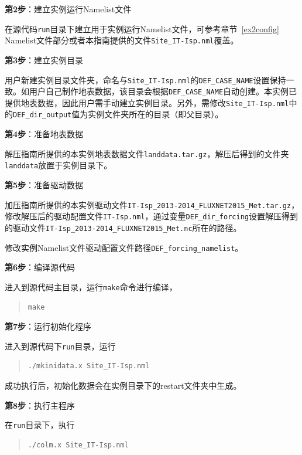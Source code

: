 \bigskip
\textbf{第2步}：建立实例运行Namelist文件

在源代码\texttt{run}目录下建立用于实例运行Namelist文件，可参考章节~\ref{ex2config} Namelist文件部分或者本指南提供的文件\texttt{Site\_IT-Isp.nml}覆盖。

\bigskip
\textbf{第3步}：建立实例目录

用户新建实例目录文件夹，命名与\texttt{Site\_IT-Isp.nml}的\texttt{DEF\_CASE\_NAME}设置保持一致。如用户自己制作地表数据，该目录会根据\texttt{DEF\_CASE\_NAME}自动创建。本实例已提供地表数据，因此用户需手动建立实例目录。另外，需修改\texttt{Site\_IT-Isp.nml}中的\texttt{DEF\_dir\_output}值为实例文件夹所在的目录（即父目录）。

\bigskip
\textbf{第4步}：准备地表数据

解压指南所提供的本实例地表数据文件\texttt{landdata.tar.gz}，解压后得到的文件夹\texttt{landdata}放置于实例目录下。

\bigskip
\textbf{第5步}：准备驱动数据

加压指南所提供的本实例驱动文件\texttt{IT-Isp\_2013-2014\_FLUXNET2015\_Met.tar.gz}，修改解压后的驱动配置文件\texttt{IT-Isp.nml}，通过变量\texttt{DEF\_dir\_forcing}设置解压得到的驱动文件\texttt{IT-Isp\_2013-2014\_FLUXNET2015\_Met.nc}所在的路径。

修改实例Namelist文件驱动配置文件路径\texttt{DEF\_forcing\_namelist}。

\bigskip
\textbf{第6步}：编译源代码

进入到源代码主目录，运行\texttt{make}命令进行编译，
\begin{quote}
\begin{lstlisting}
make
\end{lstlisting}
\end{quote}

\bigskip
\textbf{第7步}：运行初始化程序

进入到源代码下\texttt{run}目录，运行
\begin{quote}
\begin{lstlisting}
./mkinidata.x Site_IT-Isp.nml
\end{lstlisting}
\end{quote}

成功执行后，初始化数据会在实例目录下的restart文件夹中生成。

\bigskip
\textbf{第8步}：执行主程序

在\texttt{run}目录下，执行
\begin{quote}
\begin{lstlisting}
./colm.x Site_IT-Isp.nml
\end{lstlisting}
\end{quote}

